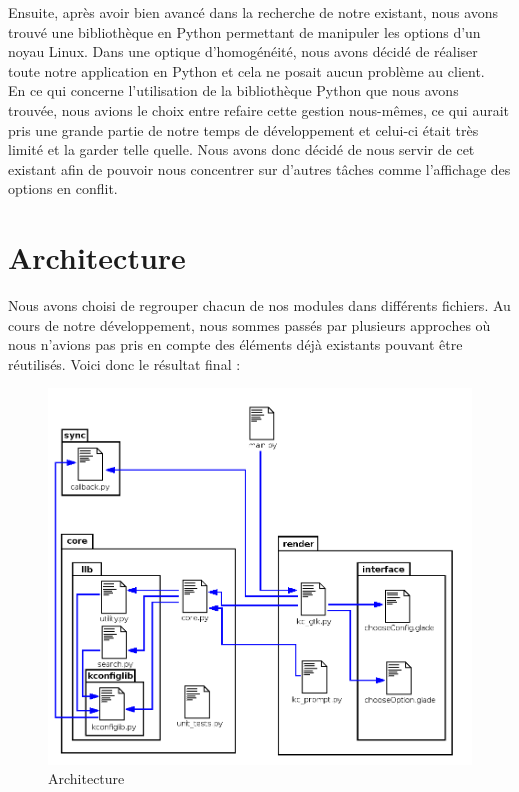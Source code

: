 ﻿\documentclass[17pts]{report}
\begin{document}
Ensuite, après avoir bien avancé dans la recherche de notre existant, nous
avons trouvé une bibliothèque en Python permettant de manipuler les options
d'un noyau Linux. Dans une optique d'homogénéité, nous avons décidé de réaliser
toute notre application en Python et cela ne posait aucun problème au client.
\\

En ce qui concerne l'utilisation de la bibliothèque Python que nous avons
trouvée, nous avions le choix entre refaire cette gestion nous-mêmes, ce qui
aurait pris une grande partie de notre temps de développement et celui-ci était
très limité et la garder telle quelle. Nous avons donc décidé de nous servir de
cet existant afin de pouvoir nous concentrer sur d'autres tâches comme
l'affichage des options en conflit.

\section{Architecture}
\label{sec:Architecture}
Nous avons choisi de regrouper chacun de nos modules dans différents fichiers.
Au cours de notre développement, nous sommes passés par plusieurs approches où
nous n'avions pas pris en compte des éléments déjà existants pouvant être
réutilisés. Voici donc le résultat final :
\begin{figure}[H]
    \includegraphics[scale=0.5]{illustrations/archi_add_v1.png}
    \centering
    \caption{Architecture}
    \label{fig:Arch}
\end{figure}
\end{document}
